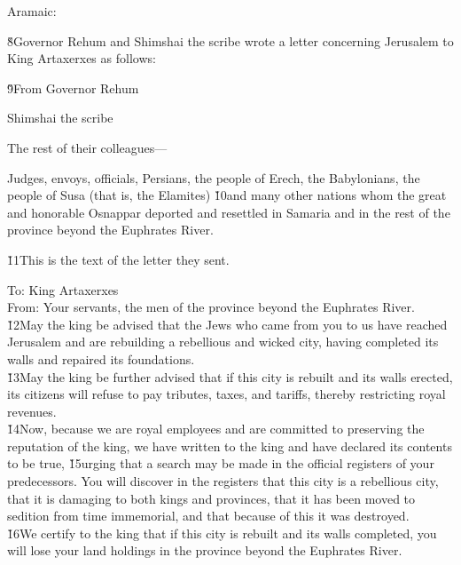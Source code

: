 Aramaic:

\v{8}Governor Rehum and Shimshai the scribe wrote a letter concerning Jerusalem to King Artaxerxes as follows:

\v{9}From Governor Rehum

Shimshai the scribe

The rest of their colleagues---

Judges, envoys, officials, Persians, the people of Erech, the Babylonians, the people of Susa (that is, the Elamites) \v{10}and many other nations whom the great and honorable Osnappar deported and resettled in Samaria and in the rest of the province beyond the Euphrates River.

\v{11}This is the text of the letter they sent.

\begin{poetry}
\poeml To: King Artaxerxes \\
\poeml From: Your servants, the men of the province beyond the Euphrates River. \\
\poeml \v{12}May the king be advised that the Jews who came from you to us have reached Jerusalem and are rebuilding a rebellious and wicked city, having completed its walls and repaired its foundations. \\
\poeml \v{13}May the king be further advised that if this city is rebuilt and its walls erected, its citizens will refuse to pay tributes, taxes, and tariffs, thereby restricting royal revenues. \\
\poeml \v{14}Now, because we are royal employees and are committed to preserving the reputation of the king, we have written to the king and have declared its contents to be true, \v{15}urging that a search may be made in the official registers of your predecessors. You will discover in the registers that this city is a rebellious city, that it is damaging to both kings and provinces, that it has been moved to sedition from time immemorial, and that because of this it was destroyed. \\
\poeml \v{16}We certify to the king that if this city is rebuilt and its walls completed, you will lose your land holdings in the province beyond the Euphrates River.
\end{poetry}

